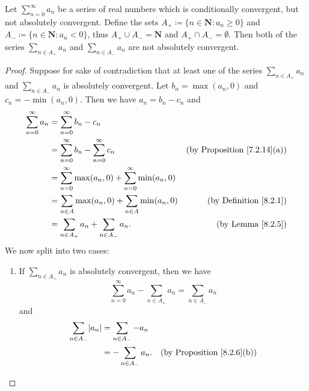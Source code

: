 \begin{lemma}\label{8.2.7}
    Let \(\sum_{n = 0}^\infty a_n\) be a series of real numbers which is conditionally convergent, but not absolutely convergent.
    Define the sets \(A_+ \coloneqq \{n \in \mathbf{N} : a_n \geq 0\}\) and \(A_- \coloneqq \{n \in \mathbf{N} : a_n < 0\}\), thus \(A_+ \cup A_- = \mathbf{N}\) and \(A_+ \cap A_- = \emptyset\).
    Then both of the series \(\sum_{n \in A_+} a_n\) and \(\sum_{n \in A_-} a_n\) are not absolutely convergent.
\end{lemma}

\begin{proof}
    Suppose for sake of contradiction that at least one of the series \(\sum_{n \in A_+} a_n\) and \(\sum_{n \in A_-} a_n\) is absolutely convergent.
    Let \(b_n = \max(a_n, 0)\) and \(c_n = -\min(a_n, 0)\).
    Then we have \(a_n = b_n - c_n\) and
    \begin{align*}
        \sum_{n = 0}^\infty a_n & = \sum_{n = 0}^\infty b_n - c_n                                                                                 \\
                                & = \sum_{n = 0}^\infty b_n - \sum_{n = 0}^\infty c_n                   & \text{(by Proposition \ref{7.2.14}(a))} \\
                                & = \sum_{n = 0}^\infty \max(a_n, 0) + \sum_{n = 0}^\infty \min(a_n, 0)                                           \\
                                & = \sum_{n \in A} \max(a_n, 0) + \sum_{n \in A} \min(a_n, 0)           & \text{(by Definition \ref{8.2.1})}      \\
                                & = \sum_{n \in A_+} a_n + \sum_{n \in A_-} a_n.                        & \text{(by Lemma \ref{8.2.5})}
    \end{align*}
    We now split into two cases:
    \begin{enumerate}
        \item If \(\sum_{n \in A_+} a_n\) is absolutely convergent, then we have
              \[
                  \sum_{n = 0}^\infty a_n - \sum_{n \in A_+} a_n = \sum_{n \in A_-} a_n
              \]
              and
              \begin{align*}
                  \sum_{n \in A_-} \abs*{a_n} & = \sum_{n \in A_-} -a_n                                           \\
                                              & = -\sum_{n \in A_-} a_n. & \text{(by Proposition \ref{8.2.6}(b))}

\end{align*}
\end{enumerate}
\end{proof}
